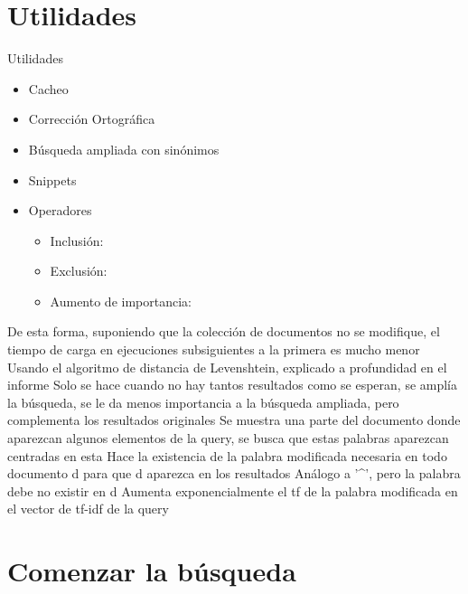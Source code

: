 \documentclass{beamer}
\begin{document}
\section{Utilidades}

\begin{frame}{Utilidades}
    \begin{itemize}
        \item<1-> Cacheo
        \item<2-> Corrección Ortográfica
        \item<3-> Búsqueda ampliada con sinónimos
        \item<4-> Snippets 
        \item<5-> Operadores
        \begin{itemize}
            \item<6-> Inclusión: 
            \item<7-> Exclusión: \color{red}{'!'}
            \item<8-> Aumento de importancia: \color{green}{'*'}
        \end{itemize} 
    \end{itemize}

    {
        De esta forma, suponiendo que la colección de documentos no se modifique, el tiempo de carga
        en ejecuciones subsiguientes a la primera es mucho menor
    }
    {
        Usando el algoritmo de distancia de Levenshtein, explicado a profundidad en el informe
    }
    {
        Solo se hace cuando no hay tantos resultados como se esperan, se amplía la búsqueda, se le da
        menos importancia a la búsqueda ampliada, pero complementa los resultados originales
    }
    {
        Se muestra una parte del documento donde aparezcan algunos elementos de la query, se busca
        que estas palabras aparezcan centradas en esta
    }
    {
        Hace la existencia de la palabra modificada necesaria en todo documento d para que d aparezca
        en los resultados 
    }
    {
        Análogo a  '\^{}', pero la palabra debe no existir en d
    }
    {
        Aumenta exponencialmente el tf de la palabra modificada en el vector de tf-idf de la query
    }
\end{frame}

\section{Comenzar la búsqueda}
\end{document}
